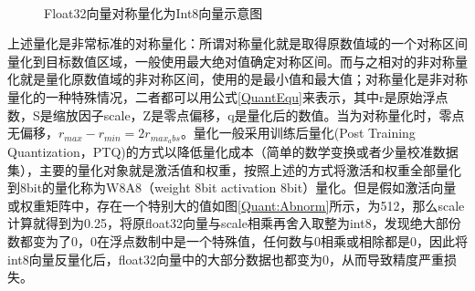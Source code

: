 \begin{figure}[htbp!]
	\centering
    
	\\
	\label{Quant}
	\caption{Float32向量对称量化为Int8向量示意图}
\end{figure}

上述量化是非常标准的对称量化：所谓对称量化就是取得原数值域的一个对称区间量化到目标数值区域，一般使用最大绝对值确定对称区间。而与之相对的非对称量化就是量化原数值域的非对称区间，使用的是最小值和最大值；对称量化是非对称量化的一种特殊情况，二者都可以用公式\ref{QuantEqu}来表示，其中r是原始浮点数，S是缩放因子scale，Z是零点偏移，q是量化后的数值。当为对称量化时，零点无偏移，$r_{max}-r_{min}=2r_{max_abs}$。量化一般采用训练后量化(Post Training Quantization，PTQ)的方式以降低量化成本（简单的数学变换或者少量校准数据集），主要的量化对象就是激活值和权重，按照上述的方式将激活和权重全部量化到8bit的量化称为W8A8（weight 8bit activation 8bit）量化。但是假如激活向量或权重矩阵中，存在一个特别大的值如图\ref{Quant:Abnorm}所示，为512，那么scale计算就得到为0.25，将原float32向量与scale相乘再舍入取整为int8，发现绝大部份数都变为了0，0在浮点数制中是一个特殊值，任何数与0相乘或相除都是0，因此将int8向量反量化后，float32向量中的大部分数据也都变为0，从而导致精度严重损失。

